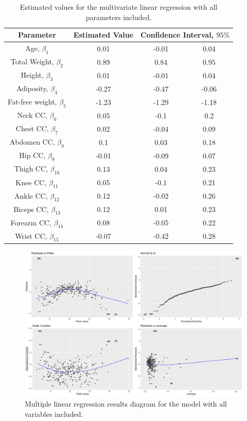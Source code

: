 \documentclass[11pt,american,american]{article}
\begin{document}
\begin{table}[H]
	\centering
	\begin{tabular}{|c||c||c|c|}
		\hline 
		Parameter &  Estimated Value & \multicolumn{2}{c|}{Confidence Interval, $95\%$}  \\ 
		\hline \hline 
		Age, $\beta_{1}$ & 0.01 & -0.01 &  0.04 \\ 
		\hline 
		Total Weight, $\beta_{2}$ & 0.89 & 0.84 &  0.95 \\ 
		\hline 
		Height, $\beta_{3}$ & 0.01 & -0.01 & 0.04 \\ 
		Adiposity, $\beta_{4}$ & -0.27 & -0.47 & -0.06  \\
		\hline 
		Fat-free weight, $\beta_{5}$ & -1.23 & -1.29 & -1.18  \\
		\hline
		Neck CC, $\beta_{6}$ & 0.05 & -0.1 & 0.2  \\
		\hline
		Chest CC, $\beta_{7}$ & 0.02 & -0.04 & 0.09  \\
		\hline
		Abdomen CC, $\beta_{8}$ & 0.1 & 0.03 & 0.18  \\
		\hline
		Hip CC, $\beta_{9}$ & -0.01 & -0.09 & 0.07  \\
		\hline
		Thigh CC, $\beta_{10}$ & 0.13 & 0.04 & 0.23  \\
		\hline
		Knee CC, $\beta_{11}$ & 0.05 & -0.1 & 0.21  \\
		\hline
		Ankle CC, $\beta_{12}$ & 0.12 & -0.02 & 0.26  \\
		\hline
		Biceps CC, $\beta_{13}$ & 0.12 & 0.01 & 0.23  \\
		\hline
		Forearm CC, $\beta_{14}$ & 0.08 & -0.05 & 0.22  \\
		\hline
		Wrist CC, $\beta_{15}$ & -0.07 & -0.42 & 0.28  \\
		\hline
	\end{tabular} 
	\caption{Estimated values for the multivariate linear regression with all parameters included.}
	\label{tab:multivar_regression}
\end{table}

\begin{figure}[H]
	\centering
	\includegraphics[width=0.95\linewidth]{Images/FIGURES/multivar_linear_regression_all}
	\caption{Multiple linear regression results diagram for the model with all variables included.}
	\label{fig:multivar_linear_regression_all}
\end{figure}
\end{document}

